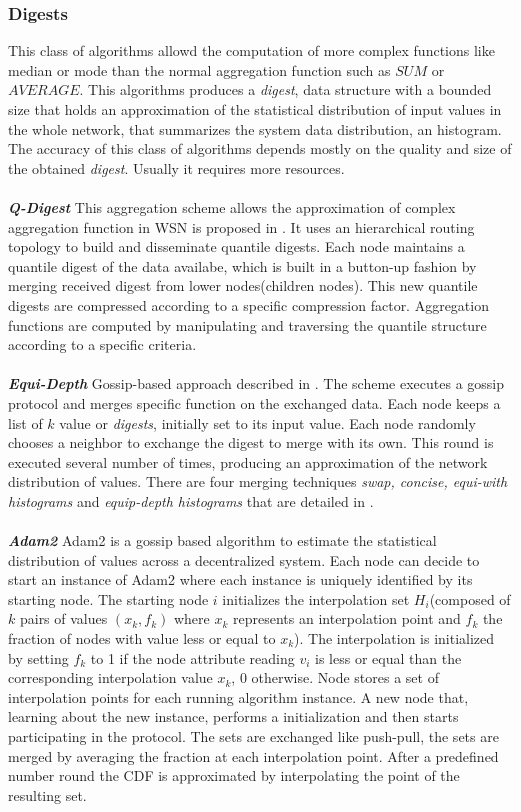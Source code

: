 \subsubsection{Digests}
This class of algorithms allowd the computation of more complex functions like median or mode than the normal aggregation function such as $SUM$ or $AVERAGE$. This algorithms produces a \textit{digest}, data structure with a bounded size that holds an approximation of the statistical distribution of input values in the whole network, that summarizes the system data distribution, an histogram. The accuracy of this class of algorithms depends mostly on the quality and size of the obtained \textit{digest}. Usually it requires more resources.\\
\\
\textbf{\textit{Q-Digest}} This aggregation scheme allows the approximation of complex aggregation function in WSN is proposed in \cite{shrivastava2004medians}. It uses an hierarchical routing topology to build and disseminate quantile digests. Each node maintains a quantile digest of the data availabe, which is built in a button-up fashion by merging received digest from lower nodes(children nodes). This new quantile digests are compressed according to a specific compression factor. Aggregation functions are computed by manipulating and traversing the quantile structure according to a specific criteria.\\
\\
\textbf{\textit{Equi-Depth}} Gossip-based approach described in \cite{horowitz2003estimating}. The scheme executes a gossip protocol and merges specific function on the exchanged data. Each node keeps a list of $k$ value or \textit{digests}, initially set to its input value. Each node randomly chooses a neighbor to exchange the digest to merge with its own. This round is executed several number of times, producing an approximation of the network distribution of values. There are four merging techniques \textit{swap, concise, equi-with histograms} and \textit{equip-depth histograms} that are detailed in \cite{journals/corr/abs-1110-0725}.\\
\\
\textbf{\textit{Adam2}}
Adam2 is a gossip based algorithm to estimate the statistical distribution of values across a decentralized 
system\cite{sacha2010adam2}. Each node can decide to start an instance of Adam2 where each instance is uniquely identified by its starting node. The starting node $i$ initializes the interpolation set $H_i$(composed of $k$ pairs of values $(x_k,f_k)$ where $x_k$ represents an interpolation point and $f_k$ the fraction of nodes with value less or equal to $x_k$). The interpolation is initialized by setting $f_k$ to 1 if the node attribute reading $v_i$ is less or equal than the corresponding interpolation value $x_k$, 0 otherwise. Node stores a set of interpolation points for each running algorithm instance. A new node that, learning about the new instance, performs a initialization and then starts participating in the protocol. The sets are exchanged like push-pull, the sets are merged by averaging the fraction at each interpolation point. After a predefined number round the CDF is approximated by interpolating the point of the resulting set.
